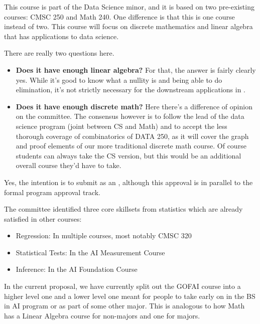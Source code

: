 

This course is part of the Data Science minor, and it is based on two pre-existing courses: CMSC 250 and
Math 240. One difference is that this is one course instead of two. This course will focus on discrete
mathematics and linear algebra that has applications to data science. 

There are really two questions here.  
\begin{itemize}
    \item \textbf{Does it have enough linear algebra?}  For that, the answer is fairly clearly yes.  While it's good to know what a nullity is and being able to do elimination, it's not strictly necessary for the downstream applications in \ai{}.
    \item \textbf{Does it have enough discrete math?}  Here there's a difference of opinion on the committee.  The consensus however is to follow the lead of the data science program (joint between CS and Math) and to accept the less thorough coverage of combinatorics of DATA 250, as it will cover the graph and proof elements of our more traditional discrete math course.  Of course students can always take the CS version, but this would be an additional overall course they'd have to take.
\end{itemize}



Yes, the intention is to submit as an , although this approval is in parallel to the formal program approval track.


The committee identified three core skillsets from statistics which are already satisfied in other courses:
\begin{itemize}
    \item Regression: In multiple courses, most notably CMSC 320
    \item Statistical Tests: In the AI Measurement Course
    \item Inference: In the AI Foundation Course
\end{itemize}


In the current proposal, we have currently split out the GOFAI course into a higher level one and a lower level one meant for people to take early on in the BS in AI program or as part of some other major.  This is analogous to how Math has a Linear Algebra course for non-majors and one for majors.

